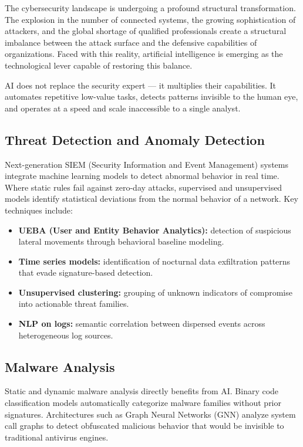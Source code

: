 \documentclass[12pt,a4paper]{report}
\begin{document}
The cybersecurity landscape is undergoing a profound structural transformation.
The explosion in the number of connected systems, the growing sophistication of
attackers, and the global shortage of qualified professionals create a structural
imbalance between the attack surface and the defensive capabilities of organizations.
Faced with this reality, artificial intelligence is emerging as the technological
lever capable of restoring this balance.

AI does not replace the security expert --- it multiplies their capabilities. It
automates repetitive low-value tasks, detects patterns invisible to the human eye,
and operates at a speed and scale inaccessible to a single analyst.

\subsection{Threat Detection and Anomaly Detection}

Next-generation SIEM (Security Information and Event Management) systems integrate
machine learning models to detect abnormal behavior in real time. Where static rules
fail against zero-day attacks, supervised and unsupervised models identify statistical
deviations from the normal behavior of a network. Key techniques include:

\begin{itemize}
    \item \textbf{UEBA (User and Entity Behavior Analytics):} detection of suspicious
    lateral movements through behavioral baseline modeling.
    \item \textbf{Time series models:} identification of nocturnal data exfiltration
    patterns that evade signature-based detection.
    \item \textbf{Unsupervised clustering:} grouping of unknown indicators of
    compromise into actionable threat families.
    \item \textbf{NLP on logs:} semantic correlation between dispersed events across
    heterogeneous log sources.
\end{itemize}

\subsection{Malware Analysis}

Static and dynamic malware analysis directly benefits from AI. Binary code
classification models automatically categorize malware families without prior
signatures. Architectures such as Graph Neural Networks (GNN) analyze system call
graphs to detect obfuscated malicious behavior that would be invisible to
traditional antivirus engines.
\end{document}
